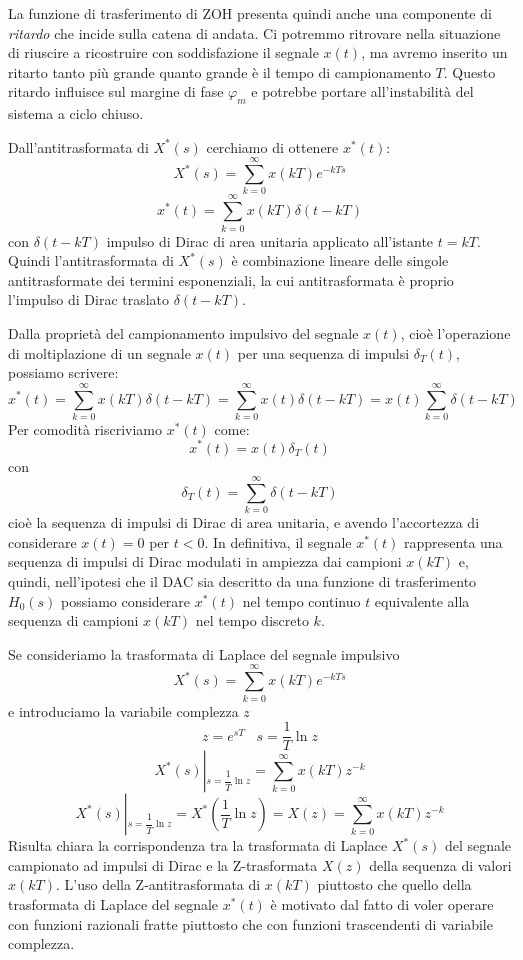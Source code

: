 \documentclass[a4paper]{report}
\begin{document}
La funzione di trasferimento di ZOH presenta quindi anche una
componente di {\em ritardo} che incide sulla catena di andata. Ci
potremmo ritrovare nella situazione di riuscire a ricostruire con
soddisfazione il segnale $x(t)$, ma avremo inserito un ritarto tanto
pi\`u grande quanto grande \`e il tempo di campionamento $T$. Questo
ritardo influisce sul margine di fase $\varphi_m$ e potrebbe portare
all'instabilit\`a del sistema a ciclo chiuso.

Dall'antitrasformata di $X^{*}(s)$ cerchiamo di ottenere $x^{*}(t)$:
\[
X^{*}(s) = \sum_{k=0}^{\infty} x(kT) e^{-kTs}
\]
\[
x^{*}(t) = \sum_{k=0}^{\infty} x(kT) \delta (t - kT)
\]
con $\delta(t - kT)$ impulso di Dirac di area unitaria applicato
all'istante $t = kT$. Quindi l'antitrasformata di $X^{*}(s)$ \`e
combinazione lineare delle singole antitrasformate dei termini
esponenziali, la cui antitrasformata \`e proprio l'impulso di Dirac
traslato $\delta(t - kT)$.

Dalla propriet\`a del campionamento impulsivo del segnale $x(t)$,
cio\`e l'operazione di moltiplazione di un segnale $x(t)$ per una
sequenza di impulsi $\delta_T(t)$, possiamo scrivere:
\[
x^{*}(t) = \sum_{k=0}^{\infty} x(kT) \delta (t - kT) =
\sum_{k=0}^{\infty} x(t) \delta (t - kT) = x(t)\sum_{k=0}^{\infty}
\delta (t - kT) 
\]
Per comodit\`a riscriviamo $x^{*}(t)$ come:
\begin{equation}
  x^{*}(t) = x(t) \delta_T(t)
\end{equation}
con
\[
\delta_T(t) = \sum_{k=0}^{\infty} \delta(t - kT)
\]
cio\`e la sequenza di impulsi di Dirac di area unitaria, e avendo
l'accortezza di considerare $x(t) = 0$ per $t < 0$. In definitiva, il
segnale $x^{*}(t)$ rappresenta una sequenza di impulsi di Dirac
modulati in ampiezza dai campioni $x(kT)$ e, quindi, nell'ipotesi che
il DAC sia descritto da una funzione di trasferimento $H_0(s)$
possiamo considerare $x^{*}(t)$ nel tempo continuo $t$ equivalente
alla sequenza di campioni $x(kT)$ nel tempo discreto $k$.

Se consideriamo la trasformata di Laplace del segnale impulsivo
\[
X^{*}(s) = \sum_{k=0}^{\infty} x(kT) e^{-kTs}
\]
e introduciamo la variabile complezza $z$
\[
z = e^{sT} \;\;\; s = \dfrac{1}{T}\ln z
\]
\[
X^{*}(s)\left|_{s = \dfrac{1}{T}\ln z}\right. = \sum_{k=0}^{\infty} x(kT) z^{-k}
\]
\[
X^{*}(s)\left|_{s = \dfrac{1}{T}\ln z}\right. = X^{*}\left(
\dfrac{1}{T} \ln z \right) = X(z) = \sum_{k=0}^{\infty} x(kT) z^{-k}
\]
Risulta chiara la corrispondenza tra la trasformata di Laplace
$X^{*}(s)$ del segnale campionato ad impulsi di Dirac e la
Z-trasformata $X(z)$ della sequenza di valori $x(kT)$. L'uso della
Z-antitrasformata di $x(kT)$ piuttosto che quello della trasformata di
Laplace del segnale $x^{*}(t)$ \`e motivato dal fatto di voler operare
con funzioni razionali fratte piuttosto che con funzioni trascendenti
di variabile complezza.
\end{document}
